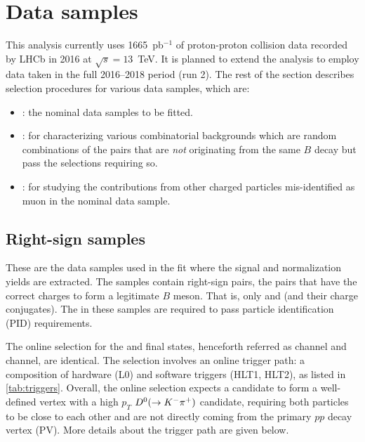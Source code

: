 \section{Data samples}
\label{ref:sel:data}

This analysis currently uses 1665~pb$^{-1}$ of proton-proton collision data
recorded by LHCb in 2016 at $\sqrt{s} = 13$~TeV.
It is planned to extend the analysis to employ data taken in the full
2016--2018 period (run 2).
The rest of the section describes selection procedures for various data samples,
which are:

\begin{itemize}
    \item {}:
        the nominal data samples to be fitted.
    \item {}:
        for characterizing various combinatorial backgrounds
        which are random combinations of the \DXmu pairs that are \emph{not}
        originating from the same $B$ decay but pass the selections
        requiring so.
    \item {}:
        for studying the contributions from other charged particles
        mis-identified as muon in the nominal data sample.
\end{itemize}


\subsection{Right-sign samples}
\label{ref:sel:data:rs}

These are the data samples used in the fit where the signal and normalization
yields are extracted.
The samples contain right-sign \DXmu pairs,
the pairs that have the correct charges to form a legitimate $B$ meson.
That is, only \Dz\mun and \Dstarp\mun (and their charge conjugates).
The \muon in these samples are required to pass \muon particle identification
(PID) requirements.

The online selection for the \Dz\mun and \Dstarp\mun final states,
henceforth referred as \Dz channel and \Dstar channel,
are identical.
The selection involves an online trigger path:
a composition of hardware (L0) and software triggers (HLT1, HLT2),
as listed in \cref{tab:triggers}.
Overall, the online selection expects a \muon candidate to form
a well-defined vertex
with a high $p_T$ ${{D}^0} (\rightarrow {\ensuremath{{K}^-}} {\ensuremath{{\pi}^+}})$ candidate,
requiring both particles to be close to each other and are not directly coming
from the primary $pp$ decay vertex (PV).
More details about the trigger path are given below.


